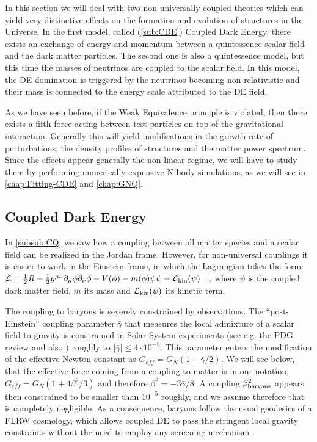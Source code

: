 In this section we will deal with two non-universally coupled theories which can yield very distinctive 
effects on the formation and evolution of structures in the Universe.
In the first model, called (\cref{sub:CDE}) Coupled Dark Energy, there exists an exchange of energy and momentum
between a quintessence scalar field and the dark matter particles. 
The second one is also a quintessence model, but this time the masses of neutrinos are 
coupled to the scalar field. In this model, the DE domination is triggered by the neutrinos becoming non-relativistic
and their mass is connected to the energy scale attributed to the DE field.

As we have seen before, if the Weak Equivalence principle is violated, then there exists a fifth force acting between test
particles on top of the gravitational interaction. Generally this will yield modifications in the growth rate of perturbations, 
the density profiles of structures and the matter power spectrum. Since the effects appear generally the non-linear regime,
we will have to study them by performing numerically expensive N-body simulations, as we will see in \cref{chap:Fitting-CDE}
and \cref{chap:GNQ}.


\subsection{Coupled Dark Energy \label{sub:CDE}}

In \cref{subsub:CQ} we saw how a coupling between all matter species and a scalar field can be realized in the Jordan frame.
However, for non-universal couplings it is easier to work in the Einstein frame, in which the Lagrangian takes the form:
\beeqalsp$\label{eq:CDE-Lagrangian}
\mathcal{L} = \frac{1}{2} R - \frac{1}{2} g^{\mu \nu}  \partial_{\mu}\phi \partial_{\nu}\phi 
- V(\phi) - m(\phi) \bar{\psi} \psi + \mathcal{L}_{\rm kin}(\psi) \quad,
$
where $\psi$ is the coupled dark matter field, $m$ its mass and $\mathcal{L}_{\rm kin}(\psi)$
its kinetic term.

The coupling to baryons is severely constrained by observations.
The ``post-Einstein'' coupling parameter $\bar{\gamma}$
that measures the local admixture of a scalar field to gravity is
constrained in Solar System experiments (see e.g. the PDG review \cite{Agashe:2014kda}
and also \citep{Will_2005,Bertotti_Iess_Tortora_2003}) roughly to
$|\bar{\gamma}|\le4\cdot10^{-5}$. This parameter enters the modification
of the effective Newton constant as $G_{eff}=G_{N}(1-\bar{\gamma}/2)$. 
We will see below, that the effective force coming from a coupling to matter is
in our notation, $G_{eff}=G_{N}(1+4\beta^{2}/3)$
and therefore $\beta^{2}=-3\bar{\gamma}/8$. A coupling $\beta_{\rm baryons}^{2}$
appears then constrained to be smaller than $10^{-5}$ roughly, and
we assume therefore that is completely negligible. As a consequence,
baryons follow the usual geodesics of a FLRW cosmology, which allows
coupled DE to pass the stringent local gravity constraints without
the need to employ any screening mechanism \citep{2015arXiv150203888H}.

